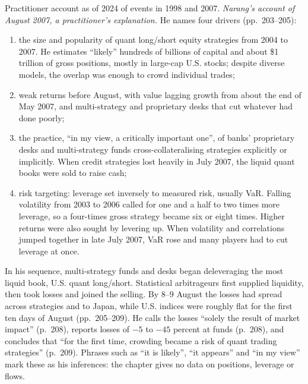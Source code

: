 \begin{qfdefinition}
 Practitioner account as of 2024 of events in 1998 and 2007. \emph{Narang's account of August 2007, a practitioner's explanation.} He names four drivers (pp.~203--205):
\begin{enumerate}
\item the size and popularity of quant long/short equity strategies from 2004 to 2007. He estimates ``likely'' hundreds of billions of capital and about \$1 trillion of gross positions, mostly in large-cap U.S. stocks; despite diverse models, the overlap was enough to crowd individual trades;
\item weak returns before August, with value lagging growth from about the end of May 2007, and multi-strategy and proprietary desks that cut whatever had done poorly;
\item the practice, ``in my view, a critically important one'', of banks' proprietary desks and multi-strategy funds cross-collateralising strategies explicitly or implicitly. When credit strategies lost heavily in July 2007, the liquid quant books were sold to raise cash;
\item risk targeting: leverage set inversely to measured risk, usually VaR. Falling volatility from 2003 to 2006 called for one and a half to two times more leverage, so a four-times gross strategy became six or eight times. Higher returns were also sought by levering up. When volatility and correlations jumped together in late July 2007, VaR rose and many players had to cut leverage at once.
\end{enumerate}
In his sequence, multi-strategy funds and desks began deleveraging the most liquid book, U.S. quant long/short. Statistical arbitrageurs first supplied liquidity, then took losses and joined the selling. By 8--9 August the losses had spread across strategies and to Japan, while U.S. indices were roughly flat for the first ten days of August (pp.~205--209). He calls the losses ``solely the result of market impact'' (p.~208), reports losses of $-5$ to $-45$ percent at funds (p.~208), and concludes that ``for the first time, crowding became a risk of quant trading strategies'' (p.~209). Phrases such as ``it is likely'', ``it appears'' and ``in my view'' mark these as his inferences: the chapter gives no data on positions, leverage or flows.


\end{qfdefinition}
